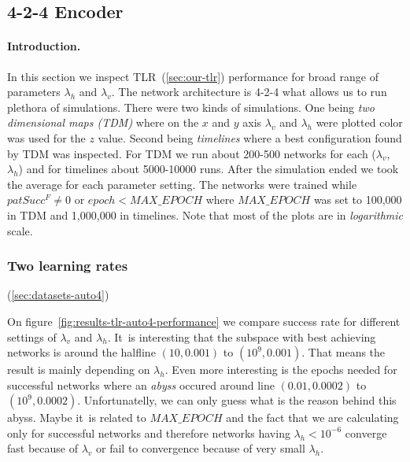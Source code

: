 

\subsection{4-2-4 Encoder} 
\label{sec:results-auto4} 

\paragraph{Introduction.} 
In this section we inspect TLR~(\ref{sec:our-tlr}) performance for broad range of parameters $\lambda_h$ and $\lambda_v$. The network architecture is 4-2-4 what allows us to run plethora of simulations. There were two kinds of simulations. One being \emph{two dimensional maps (TDM)} where on the $x$ and $y$ axis $\lambda_v$ and $\lambda_h$ were plotted color was used for the $z$ value. Second being \emph{timelines} where a best configuration found by TDM was inspected. For TDM we run about 200-500 networks for each ($\lambda_v$, $\lambda_h$) and for timelines about 5000-10000 runs. After the simulation ended we took the average for each parameter setting. The networks were trained while $patSucc^F \neq 0$ or $epoch < MAX\_EPOCH$ where $MAX\_EPOCH$ was set to 100,000 in TDM and 1,000,000 in timelines. Note that most of the plots are in \emph{logarithmic} scale. 

 

\subsubsection{Two learning rates} 
\label{sec:tlr-auto4} 
(\ref{sec:datasets-auto4}) 

On figure~\ref{fig:results-tlr-auto4-performance} we compare success rate for different settings of $\lambda_v$ and $\lambda_h$. It~is interesting that the subspace with best achieving networks is around the halfline $(10, 0.001)$ to $(10^9, 0.001)$. That means the result is mainly depending on $\lambda_h$. Even more interesting is the epochs needed for successful networks where an \emph{abyss} occured around line $(0.01, 0.0002)$ to $(10^9, 0.0002)$. Unfortunatelly, we can only guess what is the reason behind this abyss. Maybe it~is related to $MAX\_EPOCH$ and the fact that we are calculating only for successful networks and therefore networks having $\lambda_h < 10^{-6}$ converge fast because of $\lambda_v$ or fail to convergence because of very small $\lambda_h$. 


